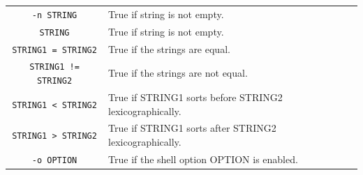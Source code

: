 \documentclass[doctor,openright,twoside]{sjtuthesis}
\newcommand{\passthrough}[1]{#1}
\theoremstyle{plain}
\theoremstyle{definition}
\theoremstyle{remark}
\theoremstyle{ocrenumbox}
\theoremstyle{plain}
\begin{document}
\begin{longtable}[]{@{}cl@{}}
\begin{minipage}[t]{0.20\columnwidth}
\passthrough{\lstinline!-n STRING!}\strut
\end{minipage} & \begin{minipage}[t]{0.74\columnwidth}\raggedright
True if string is not empty.\strut
\end{minipage}\tabularnewline
\begin{minipage}[t]{0.20\columnwidth}\centering
\passthrough{\lstinline!STRING!}\strut
\end{minipage} & \begin{minipage}[t]{0.74\columnwidth}\raggedright
True if string is not empty.\strut
\end{minipage}\tabularnewline
\begin{minipage}[t]{0.20\columnwidth}\centering
\passthrough{\lstinline!STRING1 = STRING2!}\strut
\end{minipage} & \begin{minipage}[t]{0.74\columnwidth}\raggedright
True if the strings are equal.\strut
\end{minipage}\tabularnewline
\begin{minipage}[t]{0.20\columnwidth}\centering
\passthrough{\lstinline"STRING1 != STRING2"}\strut
\end{minipage} & \begin{minipage}[t]{0.74\columnwidth}\raggedright
True if the strings are not equal.\strut
\end{minipage}\tabularnewline
\begin{minipage}[t]{0.20\columnwidth}\centering
\passthrough{\lstinline!STRING1 < STRING2!}\strut
\end{minipage} & \begin{minipage}[t]{0.74\columnwidth}\raggedright
True if STRING1 sorts before STRING2 lexicographically.\strut
\end{minipage}\tabularnewline
\begin{minipage}[t]{0.20\columnwidth}\centering
\passthrough{\lstinline!STRING1 > STRING2!}\strut
\end{minipage} & \begin{minipage}[t]{0.74\columnwidth}\raggedright
True if STRING1 sorts after STRING2 lexicographically.\strut
\end{minipage}\tabularnewline
\begin{minipage}[t]{0.20\columnwidth}\centering
\passthrough{\lstinline!-o OPTION!}\strut
\end{minipage} & \begin{minipage}[t]{0.74\columnwidth}\raggedright
True if the shell option OPTION is enabled.\strut

\end{minipage}
\end{longtable}
\end{document}
